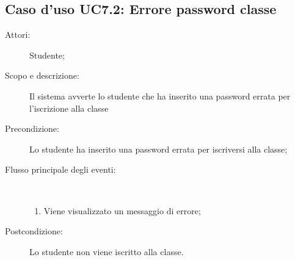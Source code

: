 \subsection{Caso d'uso UC7.2: Errore password classe}\begin{description}
\item[Attori:] Studente;
\item[Scopo e descrizione:] Il sistema avverte lo studente che ha inserito una password errata per l'iscrizione alla classe
      \item[Precondizione:] Lo studente ha inserito una password errata per iscriversi alla classe;

        \item[Flusso principale degli eventi:] \ 
 \begin{enumerate}
          \item Viene visualizzato un messaggio di errore;

      \end{enumerate}
    \item[Postcondizione:] Lo studente non viene iscritto alla classe.
  \end{description}
\hypertarget{UC8}{}
